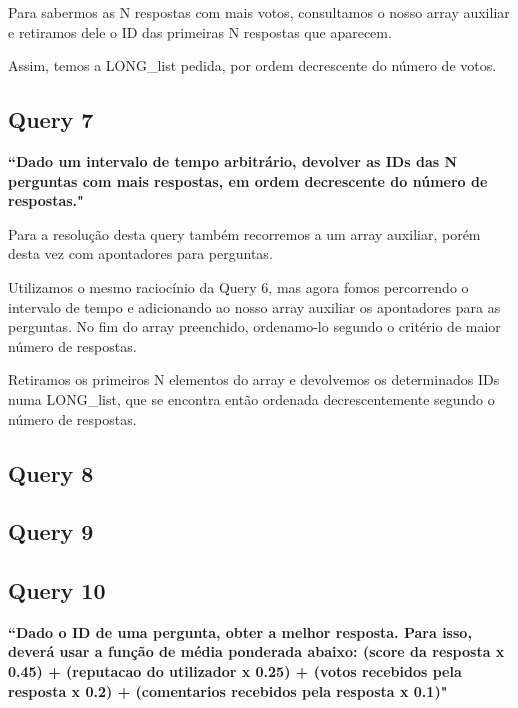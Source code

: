 \documentclass[a4paper]{report}
\begin{document}
Para sabermos as N respostas com mais votos, consultamos o nosso array auxiliar
e retiramos dele o ID das primeiras N respostas que aparecem.

Assim, temos a LONG\_list pedida, por ordem decrescente do número de votos.



\subsection*{Query 7}
\label{sec:query7}

\textbf{“Dado um intervalo de tempo arbitrário, devolver as IDs das N perguntas
com mais respostas, em ordem decrescente do número de respostas."}

Para a resolução desta query também recorremos a um array auxiliar, porém
desta vez com apontadores para perguntas.

Utilizamos o mesmo raciocínio da Query 6, mas agora fomos percorrendo o intervalo
de tempo e adicionando ao nosso array auxiliar os apontadores para as perguntas.
No fim do array preenchido, ordenamo-lo segundo o critério de maior número de respostas.

Retiramos os primeiros N elementos do array e devolvemos os determinados IDs
numa LONG\_list, que se encontra então ordenada decrescentemente segundo o número de respostas.


\subsection*{Query 8}
\label{sec:query8}

\subsection*{Query 9}
\label{sec:query9}

\subsection*{Query 10}
\label{sec:query10}
\textbf{“Dado o ID de uma pergunta, obter a melhor resposta.
Para isso, deverá usar a função de média ponderada abaixo: (score da resposta x 0.45)
+ (reputacao do utilizador x 0.25) + (votos recebidos pela resposta x 0.2) +
(comentarios recebidos pela resposta x 0.1)"}
\end{document}
